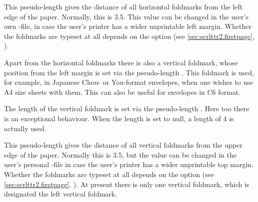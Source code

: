 \begin{Declaration}
\end{Declaration}
%
This pseudo-length gives the distance of all horizontal foldmarks from the
left edge of the paper. Normally, this is 3.5. This
value can be changed in the user's own -file, in case the user's
printer has a wider unprintable left margin. Whether the foldmarks are typeset
at all depends on the option %
 (see
\autoref{sec:scrlttr2.firstpage},
).
%
%


\begin{Declaration}
\end{Declaration}
%
Apart from the horizontal foldmarks there
is also a vertical foldmark, whose position from the left margin is set via
the pseudo-length . This foldmark is used, for example,
in Japanese Chou- or You-format envelopes, when one wishes to use A4 size
sheets with them. This can also be useful for envelopes in C6 format.%
%


\begin{Declaration}
\end{Declaration}
%
The length of the vertical foldmark is set
via the pseudo-length .  Here too there is an
exceptional behaviour. When the length is set to null, a length of 4
is actually used.%
%


\begin{Declaration}
\end{Declaration}
%
This pseudo-length gives the distance of
all vertical foldmarks from the upper edge of the paper. Normally this is
3.5, but the value can be changed in the user's
personal -file in case the user's printer has a wider unprintable
top margin.  Whether the foldmarks are typeset at all depends on the option
%
 (see
\autoref{sec:scrlttr2.firstpage},
). At present there is only one
vertical foldmark, which is designated the left vertical foldmark.
%
%


